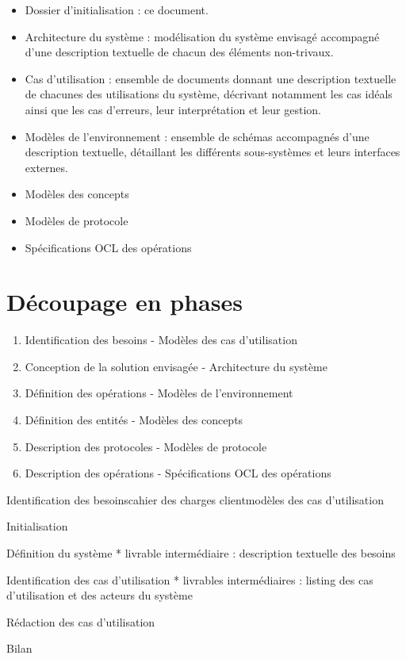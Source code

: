 \begin{itemize}
\item Dossier d'initialisation : ce document.
\item Architecture du système : modélisation du système envisagé accompagné d'une description textuelle de chacun des éléments non-trivaux.
\item Cas d'utilisation : ensemble de documents donnant une description textuelle de chacunes des utilisations du système, décrivant notamment les cas idéals ainsi que les cas d'erreurs, leur interprétation et leur gestion.
\item Modèles de l'environnement : ensemble de schémas accompagnés d'une description textuelle, détaillant les différents sous-systèmes et leurs interfaces externes.
\item Modèles des concepts
\item Modèles de protocole
\item Spécifications OCL des opérations
\end{itemize}

\section{Découpage en phases}

\begin{enumerate}
\item Identification des besoins - Modèles des cas d'utilisation
\item Conception de la solution envisagée - Architecture du système
\item Définition des opérations - Modèles de l'environnement
\item Définition des entités - Modèles des concepts
\item Description des protocoles - Modèles de protocole
\item Description des opérations - Spécifications OCL des opérations
\end{enumerate}

\begin{Phase}{Identification des besoins}{cahier des charges client}{modèles des cas d'utilisation}
\begin{SubPhases}
\item Initialisation
\item Définition du système
* livrable intermédiaire : description textuelle des besoins
\item Identification des cas d'utilisation
* livrables intermédiaires : listing des cas d'utilisation et des acteurs du système
\item Rédaction des cas d'utilisation
\item Bilan
\end{SubPhases}
\end{Phase}

